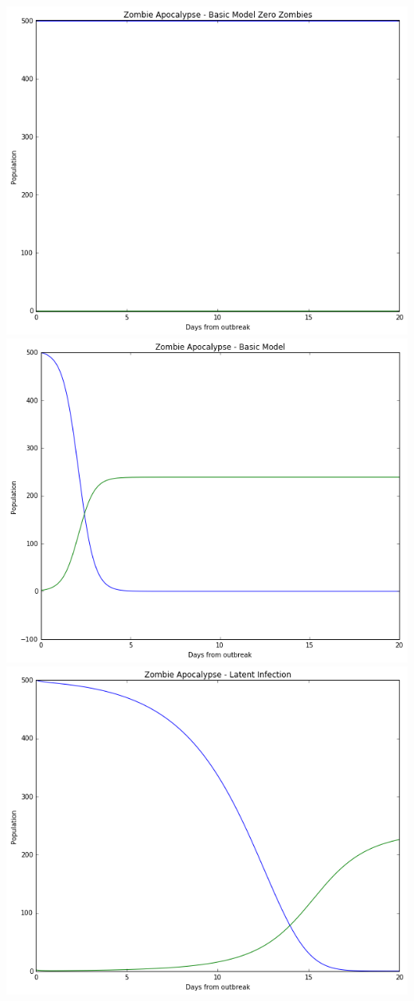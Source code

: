 \documentclass[11pt,spanish]{article}
\begin{document}
\centering

\includegraphics[scale=0.8]{0}\\
\includegraphics[scale=0.8]{basic}\\
\includegraphics[scale=0.8]{lat}\\
\end{document}
